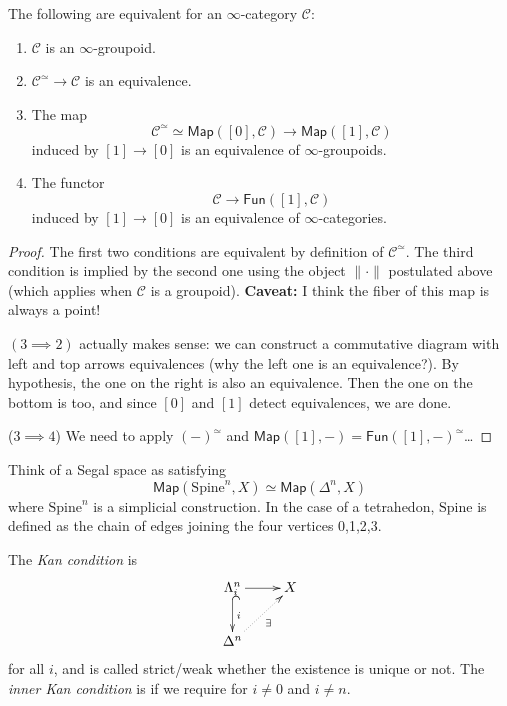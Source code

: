 \begin{lemma}
\label{lemma-equivalences-for-infty-groupoids}
The following are equivalent for an $\infty$-category $\mathcal{C}$:
\begin{enumerate}
\item $\mathcal{C}$ is an $\infty$-groupoid.

\item $\mathcal{C}^\simeq \to \mathcal{C}$ is an equivalence.

\item The map
$$
\mathcal{C}^\simeq \simeq \mathsf{Map}([0],\mathcal{C})
\to \mathsf{Map}([1],\mathcal{C})
$$
induced by $[1] \to [0]$ is an equivalence
of $\infty$-groupoids.

\item The functor
$$
\mathcal{C}\to \mathsf{Fun}([1],\mathcal{C})
$$
induced by $[1]\to [0]$ is an equivalence
of $\infty$-categories.
\end{enumerate}
\end{lemma}

\begin{proof}
The first two conditions are equivalent by definition
of $\mathcal{C}^{\simeq}$. The third condition is implied
by the second one using the object $\|\cdot\|$ postulated above
(which applies when $\mathcal{C}$ is a groupoid).
{\bf Caveat:} I think the fiber of this map is always a point!

$(3\implies 2)$ actually makes sense:
we can construct a commutative diagram with left and top arrows
equivalences (why the left one is an equivalence?).
By hypothesis, the one on the right is also an equivalence.
Then the one on the bottom is too, and since $[0]$ and $[1]$ 
detect equivalences, we are done.

($3 \implies 4$) We need to apply $(-)^\simeq$ and
$\mathsf{Map}([1],-)=\mathsf{Fun}([1],-)^\simeq$…
\end{proof}



\begin{remark}
\label{remark-Segal-spaces}
Think of a Segal space as satisfying
$$
\mathsf{Map}(\text{Spine}^n,X) \simeq \mathsf{Map}(\Delta^n,X)
$$
where $\text{Spine}^n$ is a simplicial construction. 
In the case of a tetrahedon, $\text{Spine}$ is defined as the
chain of edges joining the four vertices 0,1,2,3.
\end{remark}


The {\it Kan condition} is
$$
\xymatrix{
\Lambda^n_i\ar@{^{(}->}[d]^i \ar[r]&  X\\
\Delta^n\ar@{.>}[ur]_{\exists }
}
$$
for all $i$, 
and is called strict/weak whether the existence
is unique or not. The {\it inner Kan condition} 
is if we require for $i \neq 0$ and $i\neq n$.


